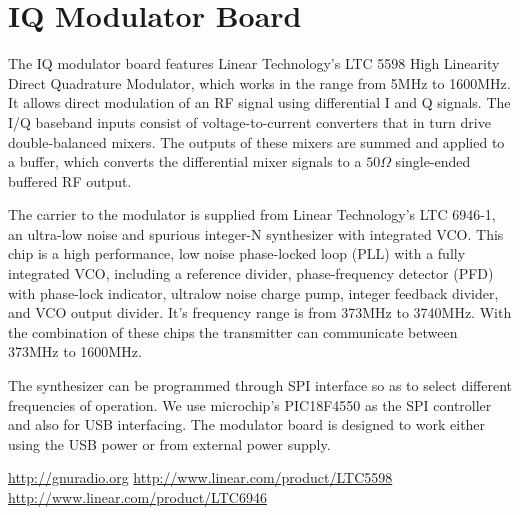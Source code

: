 \documentclass[a4paper,10pt]{report}
\begin{document}
\section{IQ Modulator Board}
The IQ modulator board features Linear Technology's LTC 5598\cite{bib:modchip}
High Linearity Direct Quadrature
Modulator, which works in the range from 5MHz to 1600MHz. 
It allows direct modulation of an RF signal using differential I and Q signals.
The I/Q baseband inputs consist of voltage-to-current converters that in turn drive double-balanced mixers.
The outputs of these mixers are summed and applied to a buffer,
which converts the differential mixer signals to a $50\Omega$ single-ended buffered RF output.

The carrier to the modulator is supplied from Linear Technology's LTC 6946-1\cite{bib:pllchip}, 
an ultra-low noise and spurious integer-N synthesizer with integrated VCO. 
This chip is a high performance, low noise phase-locked loop (PLL) with a fully integrated VCO,
including a reference divider, phase-frequency detector (PFD) with phase-lock indicator,
ultralow noise charge pump, integer feedback divider, and VCO output divider.
It's frequency range is from 373MHz to 3740MHz. 
With the combination of these chips the transmitter can communicate between 373MHz to 1600MHz.

The synthesizer can be programmed through SPI interface so as to select different frequencies of operation.
We use microchip's PIC18F4550 as the SPI controller and also for USB interfacing.
The modulator board is designed to work either using the USB power or from external power supply.


\begin{thebibliography}{9}
 \url{http://gnuradio.org}
 \url{http://www.linear.com/product/LTC5598} 
 \url{http://www.linear.com/product/LTC6946} 
 
 \end{thebibliography}
\end{document}
